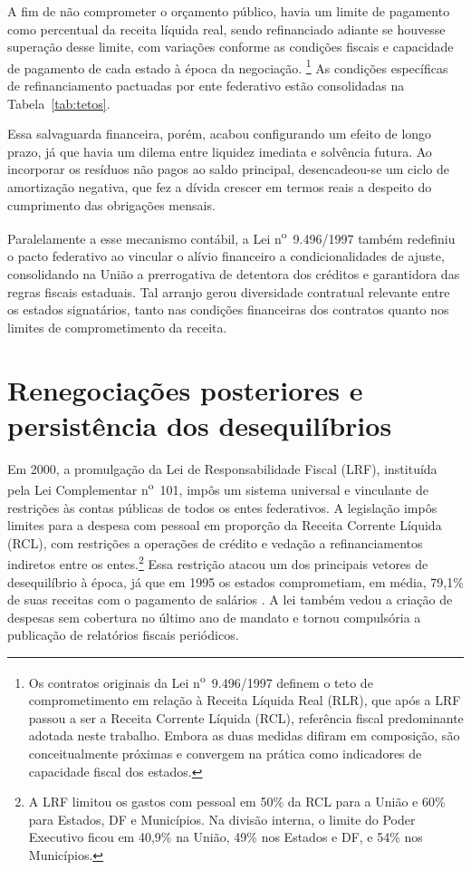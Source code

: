 A fim de não comprometer o orçamento público, havia um limite de pagamento como percentual da receita líquida real, sendo refinanciado adiante se houvesse superação desse limite, com variações conforme as condições fiscais e capacidade de pagamento de cada estado à época da negociação. \footnote{Os contratos originais da Lei n\textsuperscript{o}~9.496/1997 definem o teto de comprometimento em relação à Receita Líquida Real (RLR), que após a LRF passou a ser a Receita Corrente Líquida (RCL), referência fiscal predominante adotada neste trabalho. Embora as duas medidas difiram em composição, são conceitualmente próximas e convergem na prática como indicadores de capacidade fiscal dos estados.} As condições específicas de refinanciamento pactuadas por ente federativo estão consolidadas na Tabela~\ref{tab:tetos}.



Essa salvaguarda financeira, porém, acabou configurando um efeito de longo prazo, já que havia um dilema entre liquidez imediata e solvência futura. Ao incorporar os resíduos não pagos ao saldo principal, desencadeou-se um ciclo de amortização negativa, que fez a dívida crescer em termos reais a despeito do cumprimento das obrigações mensais.

Paralelamente a esse mecanismo contábil, a Lei n\textsuperscript{o}~9.496/1997 também redefiniu o pacto federativo ao vincular o alívio financeiro a condicionalidades de ajuste, consolidando na União a prerrogativa de detentora dos créditos e garantidora das regras fiscais estaduais. Tal arranjo gerou diversidade contratual relevante entre os estados signatários, tanto nas condições financeiras dos contratos quanto nos limites de comprometimento da receita.

\section{Renegociações posteriores e persistência dos desequilíbrios}
\label{sec:lrf}

Em 2000, a promulgação da Lei de Responsabilidade Fiscal (LRF), instituída pela Lei Complementar n\textsuperscript{o}~101, impôs um sistema universal e vinculante de restrições às contas públicas de todos os entes federativos. A legislação impôs limites para a despesa com pessoal em proporção da Receita Corrente Líquida (RCL), com restrições a operações de crédito e vedação a refinanciamentos indiretos entre os entes.\footnote{A LRF limitou os gastos com pessoal em 50\% da RCL para a União e 60\% para Estados, DF e Municípios. Na divisão interna, o limite do Poder Executivo ficou em 40,9\% na União, 49\% nos Estados e DF, e 54\% nos Municípios.} Essa restrição atacou um dos principais vetores de desequilíbrio à época, já que em 1995 os estados comprometiam, em média, 79,1\% de suas receitas com o pagamento de salários \cite{giubertiLEIRESPONSABILIDADEFISCAL}. A lei também vedou a criação de despesas sem cobertura no último ano de mandato e tornou compulsória a publicação de relatórios fiscais periódicos.

